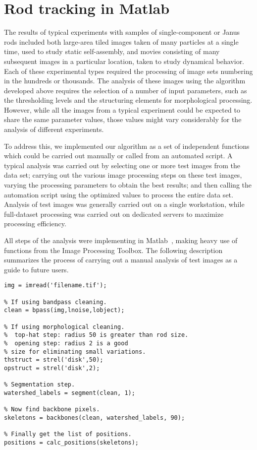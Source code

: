\chapter{Rod tracking in Matlab}
\label{sec:matlab-implementation}

The results of typical experiments with samples of single-component or Janus rods included both 
large-area tiled images taken of many particles at a single time,
used to study static self-assembly, and movies consisting of many subsequent images in a 
particular location, taken to study dynamical behavior.  Each of these experimental types required the processing
of image sets numbering in the hundreds or thousands.  The analysis of these images using the algorithm developed
above requires the selection of a number of input parameters, such as the thresholding levels and the 
structuring elements for morphological processing.  However, while all the images from a typical
experiment could be expected to share the same parameter values, those values might vary considerably for the 
analysis of different
experiments.

To address this, we implemented our algorithm as a set of independent functions which could be carried out manually 
or called from an automated script. A typical analysis was carried out by selecting one or more 
test images from the data set; carrying out the various image processing steps on these test images, varying
the processing parameters to obtain the best results; and then calling the automation script using the 
optimized values to process the entire data set.  Analysis of test images was generally carried out on a single
workstation, while full-dataset processing was carried out on dedicated servers to maximize processing efficiency.

All steps of the analysis were implementing in Matlab~\cite{matlab}, making heavy use of functions from the
Image Processing Toolbox.  The following description summarizes the process of carrying out a manual analysis of
test images as a guide to future users.

\begin{lstlisting}[label=ls:manual,caption=Typical sequence of a manual analysis]
% Load the image.
img = imread('filename.tif');

% If using bandpass cleaning.
clean = bpass(img,lnoise,lobject);

% If using morphological cleaning.
%  top-hat step: radius 50 is greater than rod size.
%  opening step: radius 2 is a good 
% size for eliminating small variations.
thstruct = strel('disk',50);
opstruct = strel('disk',2);

% Segmentation step.
watershed_labels = segment(clean, 1);

% Now find backbone pixels.
skeletons = backbones(clean, watershed_labels, 90);

% Finally get the list of positions.
positions = calc_positions(skeletons);
\end{lstlisting}

